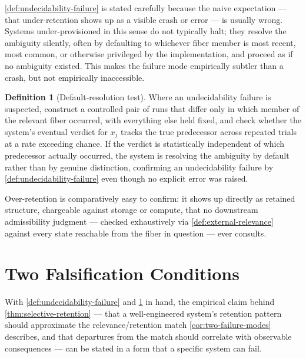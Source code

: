 \documentclass[11pt]{book}
\theoremstyle{plain}
\theoremstyle{definition}
\newtheorem{definition}[theorem]{Definition}
\theoremstyle{remark}
\begin{document}
\cref{def:undecidability-failure} is stated carefully because the
naive expectation --- that under-retention shows up as a visible
crash or error --- is usually wrong. Systems under-provisioned in this
sense do not typically halt; they resolve the ambiguity silently,
often by defaulting to whichever fiber member is most recent, most
common, or otherwise privileged by the implementation, and proceed as
if no ambiguity existed. This makes the failure mode empirically
subtler than a crash, but not empirically inaccessible.

\begin{definition}[Default-resolution test]
\label{def:default-resolution-test}
Where an undecidability failure is suspected, construct a controlled
pair of runs that differ only in which member of the relevant fiber
occurred, with everything else held fixed, and check whether the
system's eventual verdict for $x_j$ tracks the true predecessor across
repeated trials at a rate exceeding chance. If the verdict is
statistically independent of which predecessor actually occurred, the
system is resolving the ambiguity by default rather than by genuine
distinction, confirming an undecidability failure by
\cref{def:undecidability-failure} even though no explicit error was
raised.
\end{definition}

Over-retention is comparatively easy to confirm: it shows up directly
as retained structure, chargeable against storage or compute, that no
downstream admissibility judgment --- checked exhaustively via
\cref{def:external-relevance} against every state reachable from the
fiber in question --- ever consults.

\section{Two Falsification Conditions}

With \cref{def:undecidability-failure} and
\cref{def:default-resolution-test} in hand, the empirical claim behind
\cref{thm:selective-retention} --- that a well-engineered system's
retention pattern should approximate the relevance/retention match
\cref{cor:two-failure-modes} describes, and that departures from the
match should correlate with observable consequences --- can be stated
in a form that a specific system can fail.
\end{document}
